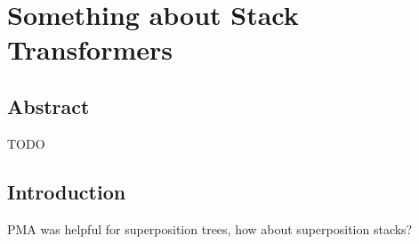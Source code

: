 \chapter{Something about Stack Transformers} \label{chap:chap-5}


\section{Abstract}
TODO
\section{Introduction}

PMA was helpful for superposition trees, how about superposition stacks?